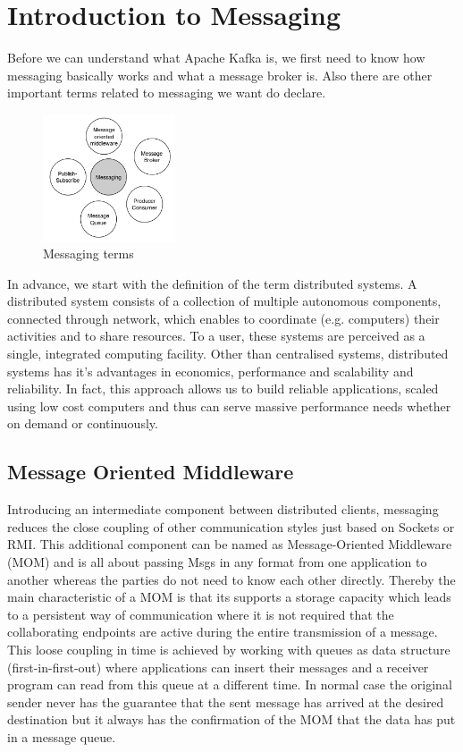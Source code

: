 \chapter{Introduction to Messaging} 

Before we can understand what Apache Kafka is, we first need to
know how messaging basically works and what a message broker is. Also there are other
important terms related to messaging we want do declare. 

\begin{figure}[H]
    \centering
    \includegraphics[width=0.35\textwidth]{images/messaging-intro.png}
    \caption{Messaging terms}
    \label{fig:MBig:the-log}
\end{figure}

In advance, we start with the definition of the term distributed systems. A distributed system
consists of a collection of multiple autonomous components, connected through
network, which enables to coordinate  (e.g. computers) their activities and to
share resources. To a user, these systems are perceived as a single, integrated
computing facility. Other than centralised systems, distributed systems has it's
advantages in economics, performance and scalability and reliability. In fact,
this approach allows us to build reliable applications, scaled using low cost
computers and thus can serve massive performance needs whether on demand or
continuously.\cite{POSA1}\cite{TAN06}
\section{Message Oriented Middleware}
\label{intro-messaging-mom}
Introducing an intermediate component between distributed
clients, messaging reduces the close coupling of other communication styles just
based on \gls{Socket}s or RMI. This additional component can be named as
Message-Oriented Middleware (MOM) and is all about passing \gls{Msg}s in any
format from one application to another whereas the parties do not need to know
each other directly. Thereby the main characteristic of a MOM is that its
supports a storage capacity which leads to a persistent way of communication where it is
not required that the collaborating endpoints are active during the entire
transmission of a message. This loose coupling in time is achieved by
working with queues as data structure (first-in-first-out) where applications
can insert their messages and a receiver program can read from this queue at a
different time. In normal case the original sender
never has the guarantee that the sent message has arrived at the desired
destination but it always has the confirmation of the MOM that the data has put
in a message queue. \cite{PprIBMIntro} \cite{TAN06}

